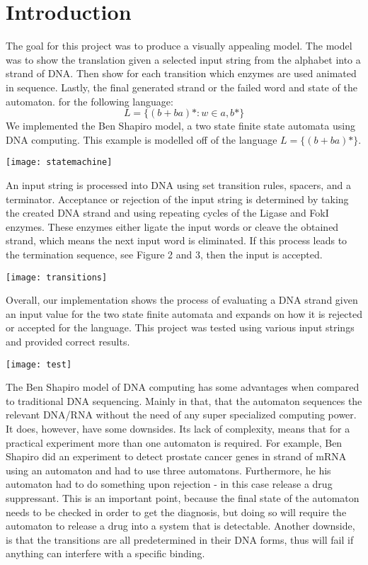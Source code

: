 \documentclass[sigconf]{acmart}
\begin{document}
\section{Introduction}
The goal for this project was to produce a visually appealing model. The model was to show the translation given a selected input string from the alphabet into a strand of DNA. Then show for each transition which enzymes are used animated in sequence. Lastly, the final generated strand or the failed word and state of the automaton. for the following language:
$$ L = \lbrace (b + ba) * : w \in {a, b}* \rbrace $$
We implemented the Ben Shapiro model, a two state finite state automata using DNA computing. This example is modelled off of the language $ L = \lbrace (b + ba)* \rbrace $.
\begin{center}
\texttt{[image: statemachine]}
\end{center}
An input string is processed into DNA using set transition rules, spacers, and a terminator. Acceptance or rejection of the input string is determined by taking the created DNA strand and using repeating cycles of the Ligase and FokI enzymes. These enzymes either ligate the input words or cleave the obtained strand, which means the next input word is eliminated. If this process leads to the termination sequence, see Figure 2 and 3, then the input is accepted.
\begin{center}
\texttt{[image: transitions]}
\end{center}

Overall, our implementation shows the process of evaluating a DNA strand given an input value for the two state finite automata and expands on how it is rejected or accepted for the language.
This project was tested using various input strings and provided correct results.
\begin{center}
	\texttt{[image: test]}
\end{center}
The Ben Shapiro model of DNA computing has some advantages when compared to traditional DNA sequencing. Mainly in that, that the automaton sequences the relevant DNA/RNA without the need of any super specialized computing power. It does, however, have some downsides. Its lack of complexity, means that for a practical experiment more than one automaton is required. For example, Ben Shapiro did an experiment to detect prostate cancer genes in strand of mRNA using an automaton and had to use three automatons. Furthermore, he his automaton had to do something upon rejection - in this case release a drug suppressant. This is an important point, because the final state of the automaton needs to be checked in order to get the diagnosis, but doing so will require the automaton to release a drug into a system that is detectable. Another downside, is that the transitions are all predetermined in their DNA forms, thus will fail if anything can interfere with a specific binding.
\end{document}
